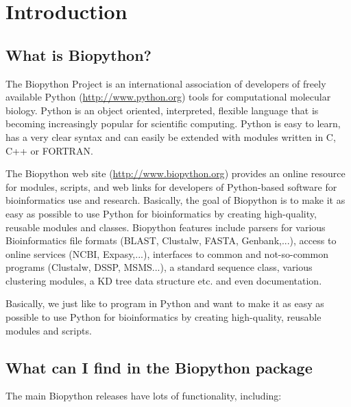 \chapter{Introduction}
\label{chapter:introduction}

\section{What is Biopython?}

The Biopython Project is an international association of developers of freely available Python (\url{http://www.python.org}) tools for computational molecular biology. Python is an object oriented, interpreted, flexible language that is becoming increasingly popular for scientific computing. Python is easy to learn, has a very clear syntax and can easily be extended with modules written in C, C++ or FORTRAN.

The Biopython web site (\url{http://www.biopython.org}) provides
an online resource for modules, scripts, and web links for developers
of Python-based software for bioinformatics use and research. Basically,
the goal of Biopython is to make it as easy as possible to use Python
for bioinformatics by creating high-quality, reusable modules and
classes. Biopython features include parsers for various Bioinformatics
file formats (BLAST, Clustalw, FASTA, Genbank,...), access to online
services (NCBI, Expasy,...), interfaces to common and not-so-common
programs (Clustalw, DSSP, MSMS...), a standard sequence class, various
clustering modules, a KD tree data structure etc. and even documentation.

Basically, we just like to program in Python and want to make it as easy as possible to use Python for bioinformatics by creating high-quality, reusable modules and scripts.

\section{What can I find in the Biopython package}

The main Biopython releases have lots of functionality, including:

